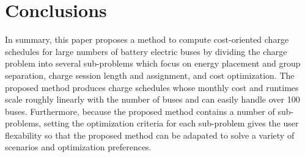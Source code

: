 \section{Conclusions}

In summary, this paper proposes a method to compute cost-oriented charge schedules for large numbers of battery electric buses by dividing the charge problem into several sub-problems which focus on energy placement and group separation, charge session length and assignment, and cost optimization. The proposed method produces charge schedules whose monthly cost and runtimes scale roughly linearly with the number of buses and can easily handle over 100 buses.
Furthermore, because the proposed method contains a number of sub-problems, setting the optimization criteria for each sub-problem gives the user flexability so that the proposed method can be adapated to solve a variety of scenarios and optimization preferences.
